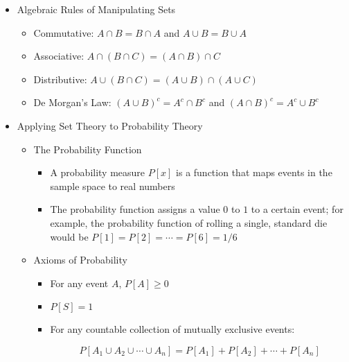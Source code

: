 \begin{itemize}
  \item Algebraic Rules of Manipulating Sets

    \begin{itemize}

      \item Commutative: $A\cap B= B\cap A$ and $A\cup B = B\cup A$

      \item Associative: $A\cap (B\cap C)= (A\cap B)\cap C$

      \item Distributive: $A\cup (B\cap C)= (A\cup B)\cap (A\cup C)$

      \item De Morgan's Law: $(A\cup B)^c = A^c\cap B^c$ and $(A\cap B)^c=A^c\cup B^c$

    \end{itemize}

  \item Applying Set Theory to Probability Theory

    \begin{itemize}

      \item The Probability Function

        \begin{itemize}

          \item A probability measure $P[x]$ is a function that maps events in the sample space to real numbers

          \item The probability function assigns a value $0$ to $1$ to a certain event; for example, the probability function of rolling a single, standard die would be $P[1]=P[2]=\cdots=P[6]=1/6$

        \end{itemize}

      \item Axioms of Probability

        \begin{itemize}

          \item For any event $A$, $P[A]\geq 0$

          \item $P[S]=1$

          \item For any countable collection of mutually exclusive events:

            $$P[A_1\cup A_2\cup\cdots\cup A_n]=P[A_1]+P[A_2]+\cdots+P[A_n]$$

        \end{itemize}

    \end{itemize}

\end{itemize}



